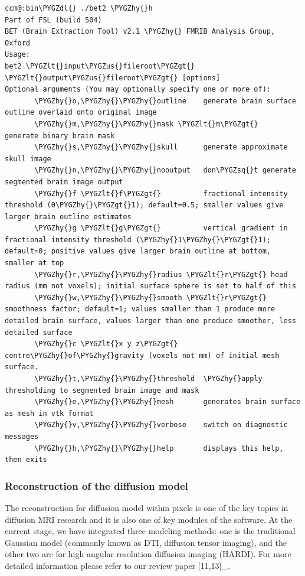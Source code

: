\documentclass[letterpaper,10pt,english]{sphinxmanual}
\def\PYGZus{\char`\_}
\def\PYGZlt{\char`\<}
\def\PYGZgt{\char`\>}
\def\PYGZdl{\char`\$}
\def\PYGZhy{\char`\-}
\def\PYGZsq{\char`\'}
\renewcommand\PYGZsq{\textquotesingle}
\begin{document}
\begin{Verbatim}[commandchars=\\\{\}]
ccm@:bin\PYGZdl{} ./bet2 \PYGZhy{}h
Part of FSL (build 504)
BET (Brain Extraction Tool) v2.1 \PYGZhy{} FMRIB Analysis Group, Oxford
Usage:
bet2 \PYGZlt{}input\PYGZus{}fileroot\PYGZgt{} \PYGZlt{}output\PYGZus{}fileroot\PYGZgt{} [options]
Optional arguments (You may optionally specify one or more of):
       \PYGZhy{}o,\PYGZhy{}\PYGZhy{}outline    generate brain surface outline overlaid onto original image
       \PYGZhy{}m,\PYGZhy{}\PYGZhy{}mask \PYGZlt{}m\PYGZgt{}   generate binary brain mask
       \PYGZhy{}s,\PYGZhy{}\PYGZhy{}skull      generate approximate skull image
       \PYGZhy{}n,\PYGZhy{}\PYGZhy{}nooutput   don\PYGZsq{}t generate segmented brain image output
       \PYGZhy{}f \PYGZlt{}f\PYGZgt{}          fractional intensity threshold (0\PYGZhy{}\PYGZgt{}1); default=0.5; smaller values give larger brain outline estimates
       \PYGZhy{}g \PYGZlt{}g\PYGZgt{}          vertical gradient in fractional intensity threshold (\PYGZhy{}1\PYGZhy{}\PYGZgt{}1); default=0; positive values give larger brain outline at bottom, smaller at top
       \PYGZhy{}r,\PYGZhy{}\PYGZhy{}radius \PYGZlt{}r\PYGZgt{} head radius (mm not voxels); initial surface sphere is set to half of this
       \PYGZhy{}w,\PYGZhy{}\PYGZhy{}smooth \PYGZlt{}r\PYGZgt{} smoothness factor; default=1; values smaller than 1 produce more detailed brain surface, values larger than one produce smoother, less detailed surface
       \PYGZhy{}c \PYGZlt{}x y z\PYGZgt{}      centre\PYGZhy{}of\PYGZhy{}gravity (voxels not mm) of initial mesh surface.
       \PYGZhy{}t,\PYGZhy{}\PYGZhy{}threshold  \PYGZhy{}apply thresholding to segmented brain image and mask
       \PYGZhy{}e,\PYGZhy{}\PYGZhy{}mesh       generates brain surface as mesh in vtk format
       \PYGZhy{}v,\PYGZhy{}\PYGZhy{}verbose    switch on diagnostic messages
       \PYGZhy{}h,\PYGZhy{}\PYGZhy{}help       displays this help, then exits
\end{Verbatim}


\subsubsection{Reconstruction of the diffusion model}
\label{userguide:reconstruction-of-the-diffusion-model}
The reconstruction for diffusion model within pixels is one of the key topics in diffusion MRI research and it is also one of key modules of the software. At the current stage, we have integrated three modeling methods: one is the traditional Gaussian model (commonly known as DTI, diffusion tensor imaging), and the other two are for high angular resolution diffusion imaging (HARDI). For more detailed information please refer to our review paper {[}11,13{]}\_.
\end{document}
